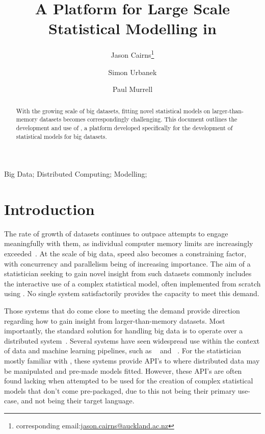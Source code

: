 \documentclass[letterpaper, inpress]{jds} %
\title{A Platform for Large Scale Statistical Modelling in \proglang{R}}
\author[1]{Jason Cairns\thanks{corresponding email:\href{mailto:jason.cairns@auckland.ac.nz}{jason.cairns@auckland.ac.nz}}}
\author[1]{Simon Urbanek}
\author[1]{Paul Murrell}
\affil[1]{Department of Statistics, University of Auckland, New Zealand}
\begin{document}
\maketitle

\begin{abstract}
With the growing scale of big datasets, fitting novel statistical models on larger-than-memory datasets becomes correspondingly challenging.
This document outlines the development and use of , a platform developed specifically for the development of statistical models for big datasets.
\end{abstract}
\begin{keywords} %
Big Data;
Distributed Computing;
Modelling;
\end{keywords}

\section{Introduction}%
\label{sec:intro}

The rate of growth of datasets continues to outpace attempts to engage meaningfully with them, as individual computer memory limits are increasingly exceeded~\citep{kleppmann2017dataintensive}.
At the scale of big data, speed also becomes a constraining factor, with concurrency and parallelism being of increasing importance.
The aim of a statistician seeking to gain novel insight from such datasets commonly includes the interactive use of a complex statistical model, often implemented from scratch using .
No single system satisfactorily provides the capacity to meet this demand.

Those systems that do come close to meeting the demand provide direction regarding how to gain insight from larger-than-memory datasets.
Most importantly, the standard solution for handling big data is to operate over a distributed system~\citep{boja2012distributed}.
Several systems have seen widespread use within the context of data and machine learning pipelines, such as ~\citep{zaharia2016apache} and ~\citep{shvachko2010hadoop}.
For the statistician mostly familiar with , these systems provide API's to  where distributed data may be manipulated and pre-made models fitted.
However, these API's are often found lacking when attempted to be used for the creation of complex statistical models that don't come pre-packaged, due to this not being their primary use-case, and  not being their target language.
\end{document}
